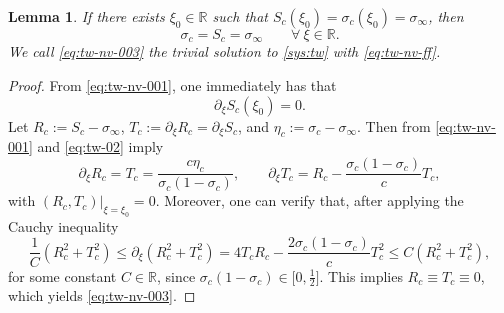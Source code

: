\documentclass[12pt]{article}
\newtheorem{lemma}[theorem]{Lemma}
\theoremstyle{definition}
\theoremstyle{remark}
\numberwithin{equation}{section}
\begin{document}
\begin{lemma}
\label{lm:no-ttrivial-point}
    If there exists $ \xi_0 \in \mathbb R $ such that $ S_c(\xi_0) = \sigma_c(\xi_0) = \sigma_\infty $, then 
    \begin{equation}
        \label{eq:tw-nv-003}
        \sigma_c = S_c = \sigma_\infty \qquad \forall \ \xi \in \mathbb R. 
    \end{equation}
    We call \eqref{eq:tw-nv-003} the trivial solution to \eqref{sys:tw} with \eqref{eq:tw-nv-ff}.
\end{lemma}
\begin{proof}
    From \eqref{eq:tw-nv-001}, %
    one immediately has that
    \begin{equation}
        \label{eq:tw-nv-004}
        \partial_\xi S_c(\xi_0) = 0 . %
    \end{equation}
    Let $ R_c := S_c - \sigma_\infty $, $ T_c := \partial_\xi R_c = \partial_{\xi}S_c $, and $ \eta_c := \sigma_c - \sigma_\infty $. Then from \eqref{eq:tw-nv-001} and \eqref{eq:tw-02} imply 
    \begin{equation}
    \label{eq:tw-nv-005}
        \partial_\xi R_c = T_c  = \frac{c \eta_c}{\sigma_c(1-\sigma_c)}, \qquad \partial_\xi T_c %
        = R_c - \frac{\sigma_c (1-\sigma_c)}{c}T_c, 
    \end{equation}
    with $ (R_c, T_c) \vert_{\xi = \xi_0} = 0 $. 
    Moreover, one can verify that, after applying the Cauchy inequality
    \begin{equation}
    \label{eq:tw-nv-005-2}
        \frac{1}{C}(R_c^2 + T_c^2) \leq \partial_\xi (R_c^2 + T_c^2) = 4 T_c R_c - \frac{2\sigma_c (1-\sigma_c)}{c}T_c^2 \leq C (R_c^2 + T_c^2), 
    \end{equation}
    for some constant $ C \in \mathbb R $, since $ \sigma_c (1-\sigma_c) \in \lbrack 0,\frac{1}{2}\rbrack $. 
    This implies $ R_c \equiv T_c \equiv 0 $, which yields \eqref{eq:tw-nv-003}.
\end{proof}
\end{document}

